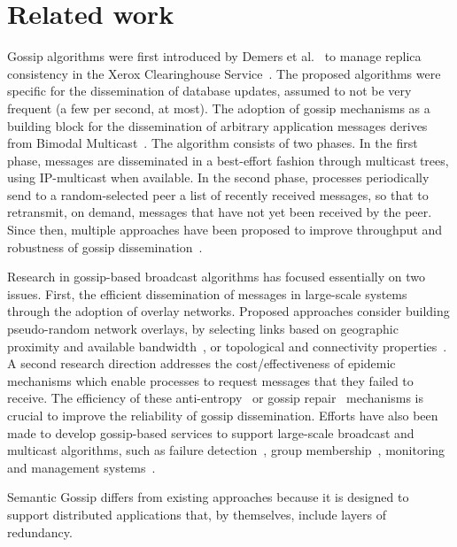 \section{Related work}
\label{sec:relwork}
\color{teal}
Gossip algorithms were first introduced by Demers et al.~\cite{demers87} to
manage replica consistency in the Xerox Clearinghouse Service~\cite{oppen83}.
The proposed algorithms were specific for the dissemination of database
updates, assumed to not be very frequent (a few per second, at most).
%
The adoption of gossip mechanisms as a building block for the dissemination of
arbitrary application messages derives from Bimodal Multicast~\cite{Birman99}.
The algorithm consists of two phases.
In the first phase, messages are disseminated in a best-effort fashion through
multicast trees, using IP-multicast when available.
In the second phase, processes periodically send to a random-selected peer a list
of recently received messages, so that to retransmit, on demand, messages that
have not yet been received by the peer.
%
Since then, multiple approaches have been proposed to improve throughput and
robustness of gossip dissemination~\cite{birman01, eugster03, gupta02, kempe04,
lin99, leitao07, melamed04, vogels03}.

Research in gossip-based broadcast algorithms has focused essentially on two
issues.
%
First, the efficient dissemination of messages in large-scale systems through
the adoption of overlay networks.
Proposed approaches consider building pseudo-random network overlays,
by selecting links based on geographic proximity and available
bandwidth~\cite{kempe04, melamed04}, or topological and connectivity
properties~\cite{lin99, leitao07, voulgaris13}.
%
A second research direction addresses the cost/effectiveness of epidemic
mechanisms which enable processes to request messages that they failed to
receive.
The efficiency of these anti-entropy~\cite{demers87, Birman99} or gossip
repair~\cite{birman01, eugster03, gupta02, vogels03} mechanisms
is crucial to improve the reliability of gossip dissemination.
%
Efforts have also been made to develop gossip-based services to support
large-scale broadcast and multicast algorithms, such as failure
detection~\cite{renesse98}, group membership~\cite{ganesh03, johansen06},
monitoring and management systems~\cite{renesse02}.

Semantic Gossip differs from existing approaches because it is designed to
support distributed applications that, by themselves, include layers of
redundancy.

